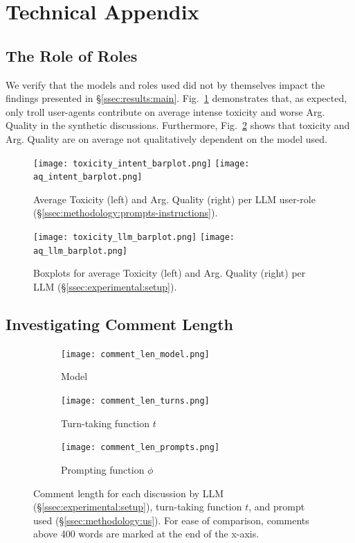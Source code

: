 %
\section{Technical Appendix}


\subsection{The Role of Roles}

We verify that the models and roles used did not by themselves impact the findings presented in \S\ref{ssec:results:main}. Fig.~\ref{fig:toxicity_aq_role} demonstrates that, as expected, only troll user-agents contribute on average intense toxicity and worse Arg. Quality in the synthetic discussions. Furthermore, Fig.~\ref{fig:toxicity_aq_model} shows that toxicity and Arg. Quality are on average not qualitatively dependent on the model used.

\begin{figure}[ht]
	\texttt{[image: toxicity\_intent\_barplot.png]} \hfill
	\texttt{[image: aq\_intent\_barplot.png]}
	\centering
	\caption{Average Toxicity (left) and Arg. Quality (right) per LLM user-role (\S\ref{ssec:methodology:prompts-instructions}).}
	\label{fig:toxicity_aq_role}
\end{figure}

\begin{figure}[ht]
	\texttt{[image: toxicity\_llm\_barplot.png]} \hfill
	\texttt{[image: aq\_llm\_barplot.png]}
	\centering
	\caption{Boxplots for average Toxicity (left) and Arg. Quality (right) per LLM (\S\ref{ssec:experimental:setup}).}
	\label{fig:toxicity_aq_model}
\end{figure}


\subsection{Investigating Comment Length}

\begin{figure}[t]
	\begin{subfigure}{0.32\linewidth}
		\texttt{[image: comment\_len\_model.png]}
		\caption{Model}
		\label{fig:comment_length_model}
	\end{subfigure}%
	\hfill
	\begin{subfigure}{0.32\linewidth}
		\texttt{[image: comment\_len\_turns.png]}
		\caption{Turn-taking function $t$}
		\label{fig:comment_length_turns}
	\end{subfigure}%
	\hfill
	\begin{subfigure}{0.32\linewidth}
		\texttt{[image: comment\_len\_prompts.png]}
		\caption{Prompting function $\phi$}
		\label{fig:comment_length_prompts}
	\end{subfigure}%
	
	\caption{Comment length for each discussion by LLM (\S\ref{ssec:experimental:setup}), turn-taking function $t$, and prompt used (\S\ref{ssec:methodology:us}). For ease of comparison, comments above 400 words are marked at the end of the x-axis.}
	\label{fig:comment_length}
\end{figure}

